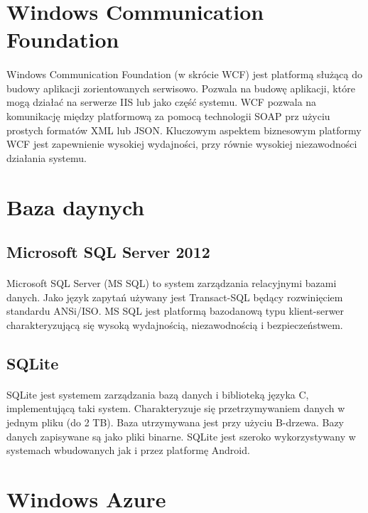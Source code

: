 \section{ Windows Communication Foundation }
\paragraph{}
Windows Communication Foundation (w skrócie WCF) jest platformą służącą do budowy aplikacji zorientowanych serwisowo. Pozwala na budowę aplikacji, które mogą działać na serwerze IIS lub jako część systemu. WCF pozwala na komunikację między platformową za pomocą technologii SOAP prz użyciu prostych formatów XML lub JSON. Kluczowym aspektem biznesowym platformy WCF jest zapewnienie wysokiej wydajności, przy równie wysokiej niezawodności działania systemu.

\section{Baza daynych}

\subsection{Microsoft SQL Server 2012}
\paragraph{}
Microsoft SQL Server (MS SQL) to system zarządzania relacyjnymi bazami danych. Jako język zapytań używany jest Transact-SQL będący rozwinięciem standardu ANSi/ISO. MS SQL jest platformą bazodanową typu klient-serwer charakteryzującą się wysoką wydajnością, niezawodnością i bezpieczeństwem.

\subsection{SQLite} %
\paragraph{} %
SQLite jest systemem zarządzania bazą danych i biblioteką języka C, implementującą taki system. Charakteryzuje się przetrzymywaniem danych w jednym pliku (do 2 TB). Baza utrzymywana jest przy użyciu B-drzewa. Bazy danych zapisywane są jako pliki binarne. SQLite jest szeroko wykorzystywany w systemach wbudowanych jak i przez platformę Android.

\section{Windows Azure} %

